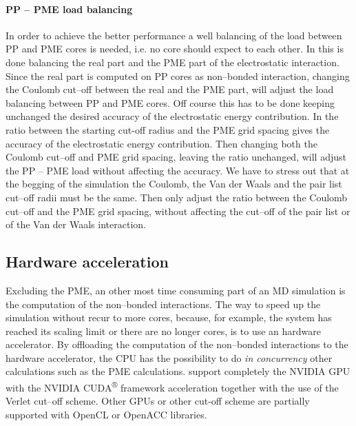 \paragraph{\textbf{PP -- PME load balancing}} In order to achieve the better performance a well balancing of the load between \ac{PP} and \ac{PME} cores is needed, i.e. no core should expect to each other. In \gromacs this is done balancing the real part and the \ac{PME} part of the electrostatic interaction. Since the real part is computed on \ac{PP} cores as non--bonded interaction, changing the Coulomb cut--off between the real and the \ac{PME} part, will adjust the load balancing between \ac{PP} and \ac{PME} cores. Off course this has to be done keeping unchanged the desired accuracy of the electrostatic energy contribution. In \gromacs the ratio between the starting cut-off radius and the \ac{PME} grid spacing gives the accuracy of the electrostatic energy contribution. Then changing both the Coulomb cut--off and \ac{PME} grid spacing, leaving the ratio unchanged, will adjust the \ac{PP} -- \ac{PME} load without affecting the accuracy. We have to stress out that at the begging of the simulation the Coulomb, the Van der Waals and the pair list cut--off radii must be the same. Then \gromacs only adjust the ratio between the Coulomb cut--off and the \ac{PME} grid spacing, without affecting the cut--off of the pair list or of the Van der Waals interaction.

\subsection{Hardware acceleration}
Excluding the \ac{PME}, an other most time consuming part of an \ac{MD} simulation is the computation of the non--bonded interactions. The way to speed up the simulation without recur to more cores, because, for example, the system has reached its scaling limit or there are no longer cores, is to use an hardware accelerator. By offloading the computation of the non--bonded interactions to the hardware accelerator, the CPU has the possibility to do \textit{in concurrency} other calculations such as the \ac{PME} calculations. \gromacs support completely the NVIDIA GPU with the NVIDIA CUDA\textsuperscript{®} framework acceleration together with the use of the Verlet cut--off scheme. Other GPUs or other cut-off scheme are partially supported with OpenCL or OpenACC libraries. 

